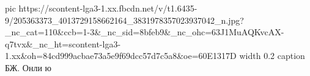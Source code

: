  
 
 
 
 

\ifcmt
  pic https://scontent-lga3-1.xx.fbcdn.net/v/t1.6435-9/205363373_4013729158662164_3831978357023937042_n.jpg?_nc_cat=110&ccb=1-3&_nc_sid=8bfeb9&_nc_ohc=63J1MuAQKvcAX-q7tvx&_nc_ht=scontent-lga3-1.xx&oh=84cd999acbae73a5e9f69dcc57d7c5a8&oe=60E1317D
  width 0.2
	caption БЖ. Онли ю
\fi

